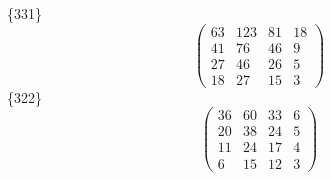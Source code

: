 \documentclass[12pt,reqno]{amsart}
\begin{document}
\{331\}                             $$ \begin{pmatrix} 
                        63 & 123 & 81 & 18 \\[6pt]
                         41 & 76 & 46 & 9 \\[6pt]
                         27 & 46 & 26 & 5 \\[6pt]
                           18 & 27 & 15 & 3
                              \end{pmatrix} $$ 
\{322\}                             $$ \begin{pmatrix} 
                         36 & 60 & 33 & 6 \\[6pt]
                         20 & 38 & 24 & 5 \\[6pt]
                         11 & 24 & 17 & 4 \\[6pt]
                            6 & 15 & 12 & 3
                              \end{pmatrix} $$ 
\end{document}
